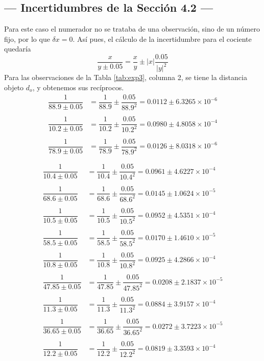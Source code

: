 \documentclass[10pt,a4paper]{article}
\begin{document}
\subsection{--- Incertidumbres de la Sección 4.2 ---} %
Para este caso el numerador no se trataba de una observación, sino de un número fijo, por lo que $\delta x=0$. Así pues, el cálculo de la incertidumbre para el cociente quedaría
\label{sub:incert_part_2}
\[
	\dfrac{x}{y\pm0.05}=\dfrac{x}{y}\pm|x|\dfrac{0.05}{|y|^2}
\]
	Para las observaciones de la Tabla \ref{tab:exp3}, columna 2, se tiene la distancia objeto $d_o$, y obtenemos sus recíprocos.
	\begin{align*}
		\dfrac{1}{88.9\pm 0.05}&=\dfrac{1}{88.9}\pm\dfrac{0.05}{88.9^2}=0.0112\pm6.3265\times10^{-6}\\\\
		\dfrac{1}{10.2\pm 0.05}&=\dfrac{1}{10.2}\pm\dfrac{0.05}{10.2^2}=0.0980\pm4.8058\times10^{-4}\\\\
		\dfrac{1}{78.9\pm 0.05}&=\dfrac{1}{78.9}\pm\dfrac{0.05}{78.9^2}=0.0126\pm8.0318\times10^{-6}\\\\
	\end{align*}
	\begin{align*}
		\dfrac{1}{10.4\pm 0.05}&=\dfrac{1}{10.4}\pm\dfrac{0.05}{10.4^2}=0.0961\pm4.6227\times10^{-4}\\\\
		\dfrac{1}{68.6\pm 0.05}&=\dfrac{1}{68.6}\pm\dfrac{0.05}{68.6^2}=0.0145\pm1.0624\times10^{-5}\\\\
		\dfrac{1}{10.5\pm 0.05}&=\dfrac{1}{10.5}\pm\dfrac{0.05}{10.5^2}=0.0952\pm4.5351\times10^{-4}\\\\
		\dfrac{1}{58.5\pm 0.05}&=\dfrac{1}{58.5}\pm\dfrac{0.05}{58.5^2}=0.0170\pm1.4610\times10^{-5}\\\\
		\dfrac{1}{10.8\pm 0.05}&=\dfrac{1}{10.8}\pm\dfrac{0.05}{10.8^2}=0.0925\pm4.2866\times10^{-4}\\\\
		\dfrac{1}{47.85\pm 0.05}&=\dfrac{1}{47.85}\pm\dfrac{0.05}{47.85^2}=0.0208\pm2.1837\times10^{-5}\\\\
		\dfrac{1}{11.3\pm 0.05}&=\dfrac{1}{11.3}\pm\dfrac{0.05}{11.3^2}=0.0884\pm3.9157\times10^{-4}\\\\
		\dfrac{1}{36.65\pm 0.05}&=\dfrac{1}{36.65}\pm\dfrac{0.05}{36.65^2}=0.0272\pm3.7223\times10^{-5}\\\\
		\dfrac{1}{12.2\pm 0.05}&=\dfrac{1}{12.2}\pm\dfrac{0.05}{12.2^2}=0.0819\pm3.3593\times10^{-4}
	\end{align*}
\end{document}
